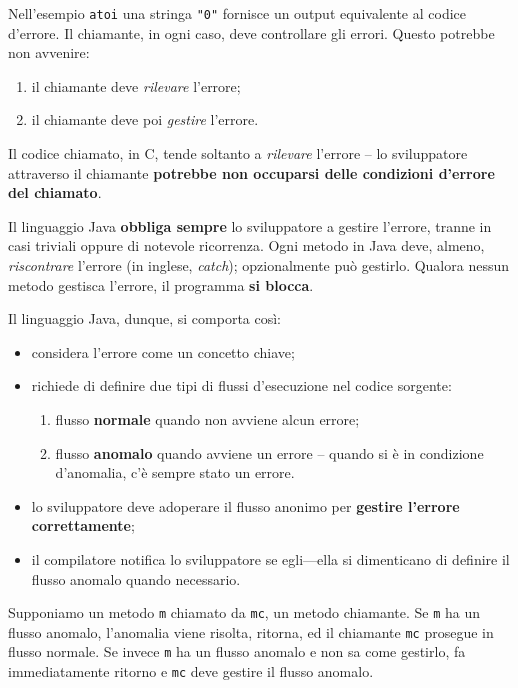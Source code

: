 \documentclass[\fontsizeclass,twocolumn]{\classname}
\theoremstyle{definition}
\theoremstyle{definition}
\begin{document}
 Nell'esempio \texttt{atoi} una stringa \texttt{"0"} fornisce un output
 equivalente al codice d'errore. Il chiamante, in ogni caso, deve controllare
 gli errori. Questo potrebbe non avvenire:
\begin{enumerate}
    \item il chiamante deve \emph{rilevare} l'errore;
    \item il chiamante deve poi \emph{gestire} l'errore.
\end{enumerate}

Il codice chiamato, in C, tende soltanto a \emph{rilevare} l'errore -- lo
sviluppatore attraverso il chiamante \textbf{potrebbe non occuparsi delle
condizioni d'errore del chiamato}.

Il linguaggio Java \textbf{obbliga sempre} lo sviluppatore a gestire l'errore,
tranne in casi triviali oppure di notevole ricorrenza. Ogni metodo in Java
deve, almeno, \emph{riscontrare} l'errore (in inglese, \emph{catch});
opzionalmente può gestirlo. Qualora nessun metodo gestisca l'errore, il
programma \textbf{si blocca}.

Il linguaggio Java, dunque, si comporta così:
\begin{itemize}
    \item considera l'errore come un concetto chiave;
    \item richiede di definire due tipi di flussi d'esecuzione nel codice
        sorgente:
    \begin{enumerate}
        \item flusso \textbf{normale} quando non avviene alcun errore;
        \item flusso \textbf{anomalo} quando avviene un errore -- quando si è in
            condizione d'anomalia, c'è sempre stato un errore.
    \end{enumerate}
    \item lo sviluppatore deve adoperare il flusso anonimo per \textbf{gestire
        l'errore correttamente};
    \item il compilatore notifica lo sviluppatore se egli---ella si dimenticano
        di definire il flusso anomalo quando necessario.
\end{itemize}

Supponiamo un metodo \texttt{m} chiamato da \texttt{mc}, un metodo chiamante.
Se \texttt{m} ha un flusso anomalo, l'anomalia viene risolta, ritorna, ed il
chiamante \texttt{mc} prosegue in flusso normale. Se invece \texttt{m} ha un
flusso anomalo e non sa come gestirlo, fa immediatamente ritorno e \texttt{mc}
deve gestire il flusso anomalo.
\end{document}
